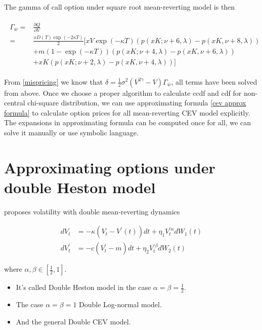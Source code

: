 The gamma of call option under square root mean-reverting model is then

\begin{equation}\label{gamma}
    \begin{aligned}
        \begin{aligned}
            \Gamma_{\bar{w}}= & \frac{\partial Q}{\partial V} \\
            =& \frac{x D(T) \exp(-2\kappa T)}{2} [
            xV \exp (-\kappa T) (p(xK; \nu+6, \lambda) - p(xK,\nu+8,\lambda)) \\
            &+m (1-\exp (-\kappa T)) (p(xK; \nu+4, \lambda)-p(xK,\nu+6,\lambda)) \\
            &+ xK (p(x K; \nu+2, \lambda)-p(xK,\nu+4,\lambda))]
            \end{aligned}
    \end{aligned}
\end{equation}

From \eqref{mispricing} we know that $\delta = \frac{1}{2} \sigma^2 (V^{2\gamma}-V) \Gamma_{\bar{w}}$, all terms have been solved from above. Once we choose a proper algorithm to calculate ccdf and cdf for non-central chi-square distribution,  we can use approximating formula \ref{cev approx formula} to calculate option prices for all mean-reverting CEV model explicitly. The expansions in approximating formula can be computed once for all, we can solve it manually or use symbolic language.

\section{Approximating options under double Heston model}

\cite{gatheral_consistent_nodate} proposes volatility with double mean-reverting dynamics

$$
    \begin{aligned}
        d V_t &=-\kappa\left(V_t-V^{\prime}(t)\right) d t+\eta_{1} V^{\prime \alpha}_t  d W_1(t) \\
        d V^{\prime}_t &=-c\left(V^{\prime}_t-m\right) d t+\eta_{2} V^{\prime \beta}_t d W_{2}(t)
    \end{aligned}
$$

\noindent where $\alpha, \beta \in [\frac{1}{2},1]$.

\begin{itemize}
    \item It's called Double Heston model in the case $\alpha=\beta=\frac{1}{2}$.
    \item The case $\alpha=\beta=1$ Double Log-normal model.
    \item And the general Double CEV model.
\end{itemize}

